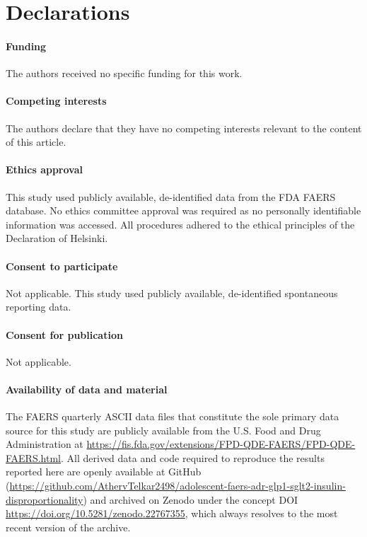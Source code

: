 \documentclass[10pt,a4paper]{article}
\begin{document}


\section*{Declarations}

\paragraph*{Funding} The authors received no specific funding for this work.

\paragraph*{Competing interests} The authors declare that they have no competing interests relevant to the content of this article.

\paragraph*{Ethics approval} This study used publicly available, de-identified data from the FDA FAERS database. No ethics committee approval was required as no personally identifiable information was accessed. All procedures adhered to the ethical principles of the Declaration of Helsinki.

\paragraph*{Consent to participate} Not applicable. This study used publicly available, de-identified spontaneous reporting data.

\paragraph*{Consent for publication} Not applicable.

\paragraph*{Availability of data and material}
The FAERS quarterly ASCII data files that constitute the sole primary data source for this study are publicly available from the U.S. Food and Drug Administration at \url{https://fis.fda.gov/extensions/FPD-QDE-FAERS/FPD-QDE-FAERS.html}. All derived data and code required to reproduce the results reported here are openly available at GitHub (\url{https://github.com/AthervTelkar2498/adolescent-faers-adr-glp1-sglt2-insulin-disproportionality}) and archived on Zenodo under the concept DOI \url{https://doi.org/10.5281/zenodo.22767355}, which always resolves to the most recent version of the archive.
\end{document}
